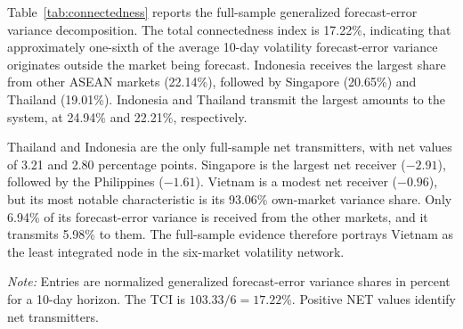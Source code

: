 \documentclass[12pt,a4paper]{article}
\begin{document}
Table~\ref{tab:connectedness} reports the full-sample generalized forecast-error variance decomposition. The total connectedness index is 17.22\%, indicating that approximately one-sixth of the average 10-day volatility forecast-error variance originates outside the market being forecast. Indonesia receives the largest share from other ASEAN markets (22.14\%), followed by Singapore (20.65\%) and Thailand (19.01\%). Indonesia and Thailand transmit the largest amounts to the system, at 24.94\% and 22.21\%, respectively.

Thailand and Indonesia are the only full-sample net transmitters, with net values of 3.21 and 2.80 percentage points. Singapore is the largest net receiver ($-2.91$), followed by the Philippines ($-1.61$). Vietnam is a modest net receiver ($-0.96$), but its most notable characteristic is its 93.06\% own-market variance share. Only 6.94\% of its forecast-error variance is received from the other markets, and it transmits 5.98\% to them. The full-sample evidence therefore portrays Vietnam as the least integrated node in the six-market volatility network.

\begin{table}[H]
\centering
\caption{Full-sample ASEAN volatility connectedness}
\label{tab:connectedness}
\begin{minipage}{0.92\textwidth}
\footnotesize\textit{Note:} Entries are normalized generalized forecast-error variance shares in percent for a 10-day horizon. The TCI is $103.33/6=17.22\%$. Positive NET values identify net transmitters.
\end{minipage}
\end{table}
\end{document}
